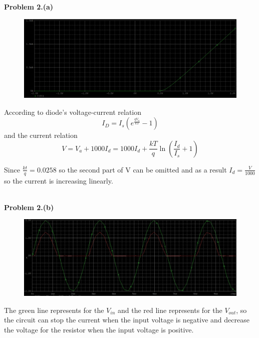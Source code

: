 \documentclass[12pt]{article}
\begin{document}
\newpage
\textbf{Problem 2.(a)}
\begin{figure}[H]
\centering
\includegraphics[scale=0.25]{P1.png}
\end{figure}
According to diode's voltage-current relation $$I_D=I_s(e^\frac{qV_a}{kT}-1)$$ and the current relation $$V=V_a+1000I_d=1000I_d+\frac{kT}{q}\ln(\frac{I_d}{I_s}+1)$$
\par Since $\frac{kt}{q}=0.0258$ so the second part of V can be omitted and as a result $I_d=\frac{V}{1000}$
so the current is increasing linearly.
\\\
\par \textbf{Problem 2.(b)}
\begin{figure}[H]
\centering
\includegraphics[scale=0.25]{P2.png}
\end{figure}
The green line represents for the $V_{in}$ and the red line represents for the $V_{out}$, so the circuit can stop the current when the input voltage is negative and decrease the voltage for the resistor when the input voltage is positive.
\end{document}
